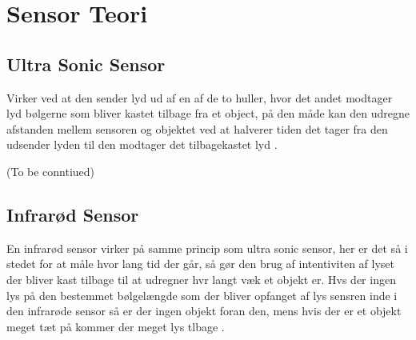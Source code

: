 \chapter{Sensor Teori}
\section{Ultra Sonic Sensor}
Virker ved at den sender lyd ud af en af de to huller, hvor det andet modtager
lyd bølgerne som bliver kastet tilbage fra et object, på den måde kan den
udregne afstanden mellem sensoren og objektet ved at halverer tiden det tager
fra den udsender lyden til den modtager det tilbagekastet lyd \PS.

(To be conntiued)

\section{Infrarød Sensor}
En infrarød sensor virker på samme princip som ultra sonic sensor, her er det så
i stedet for at måle hvor lang tid der går, så gør den brug af intentiviten af
lyset der bliver kast tilbage til at udregner hvr langt væk et objekt er. Hvs
der ingen lys på den bestemmet bølgelængde som der bliver opfanget af lys
sensren inde i den infrarøde sensor så er der ingen objekt foran den, mens hvis
der er et objekt meget tæt på kommer der meget lys tlbage \PS. 












